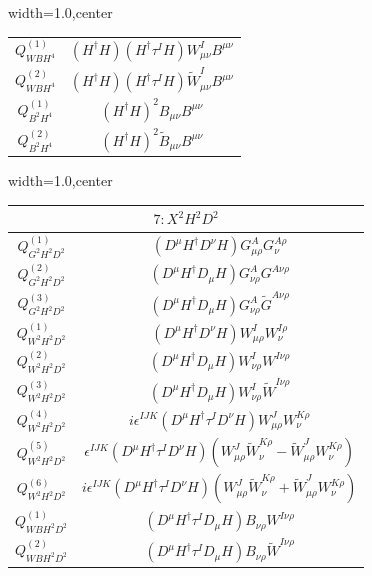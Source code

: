 \begin{table}[H]
\begin{center}
\begin{adjustbox}{width=1.0\textwidth,center}
\begin{minipage}[t]{6cm}
\begin{tabular}[t]{c|c}
%
$Q_{WBH^4}^{(1)}$  & $ (H^\dag H) (H^\dag \tau^I H) W^I_{\mu\nu} B^{\mu\nu}$ \\
%
$Q_{WBH^4}^{(2)}$  & $(H^\dag H) (H^\dag \tau^I H) \widetilde W^I_{\mu\nu} B^{\mu\nu}$ \\
%
$Q_{B^2H^4}^{(1)}$  & $ (H^\dag H)^2 B_{\mu\nu} B^{\mu\nu}$ \\
%
$Q_{B^2H^4}^{(2)}$  & $(H^\dag H)^2 \widetilde B_{\mu\nu} B^{\mu\nu}$ \\
%
\end{tabular}
\end{minipage}
\end{adjustbox}
\begin{adjustbox}{width=1.0\textwidth,center}
\small
\begin{minipage}[t]{7.8cm}
\renewcommand{\arraystretch}{1.5}
\begin{tabular}[t]{c|c}
\multicolumn{2}{c}{\boldmath$7:X^2H^2D^2$} \\
\hline
$Q_{G^2H^2D^2}^{(1)}$  &  $(D^{\mu} H^{\dag} D^{\nu} H) G_{\mu\rho}^A G_{\nu}^{A \rho}$ \\
%
$Q_{G^2H^2D^2}^{(2)}$  &  $(D^{\mu} H^{\dag} D_{\mu} H) G_{\nu\rho}^A G^{A \nu\rho}$ \\
%
$Q_{G^2H^2D^2}^{(3)}$  &  $(D^{\mu} H^{\dag} D_{\mu} H) G_{\nu\rho}^A \widetilde{G}^{A \nu\rho}$ \\
%
$Q_{W^2H^2D^2}^{(1)}$  &  $(D^{\mu} H^{\dag} D^{\nu} H) W_{\mu\rho}^I W_{\nu}^{I \rho}$ \\
%
$Q_{W^2H^2D^2}^{(2)}$  &  $(D^{\mu} H^{\dag} D_{\mu} H) W_{\nu\rho}^I W^{I \nu\rho}$ \\
%
$Q_{W^2H^2D^2}^{(3)}$  &  $(D^{\mu} H^{\dag} D_{\mu} H) W_{\nu\rho}^I \widetilde{W}^{I \nu\rho}$ \\
%
$Q_{W^2H^2D^2}^{(4)}$  &  $i \epsilon^{IJK} (D^{\mu} H^{\dag} \tau^I D^{\nu} H) W_{\mu\rho}^J W_{\nu}^{K \rho}$ \\
%
$Q_{W^2H^2D^2}^{(5)}$  &  $\epsilon^{IJK} (D^{\mu} H^{\dag} \tau^I D^{\nu} H) (W_{\mu\rho}^J \widetilde{W}_{\nu}^{K \rho} - \widetilde{W}_{\mu\rho}^J W_{\nu}^{K \rho})$ \\
%
$Q_{W^2H^2D^2}^{(6)}$  &  $i \epsilon^{IJK} (D^{\mu} H^{\dag} \tau^I D^{\nu} H) (W_{\mu\rho}^J \widetilde{W}_{\nu}^{K \rho} + \widetilde{W}_{\mu\rho}^J W_{\nu}^{K \rho})$ \\
%
$Q_{WBH^2D^2}^{(1)}$  &  $(D^{\mu} H^{\dag} \tau^I D_{\mu} H) B_{\nu\rho} W^{I \nu\rho}$ \\
%
$Q_{WBH^2D^2}^{(2)}$  &  $(D^{\mu} H^{\dag} \tau^I D_{\mu} H) B_{\nu\rho} \widetilde{W}^{I \nu\rho}$ \\

\end{tabular}
\end{minipage}
\end{adjustbox}
\end{center}
\end{table}
